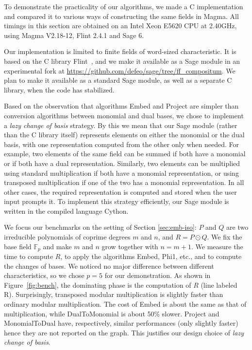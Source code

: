\documentclass{sig-alternate}
\def\F {\ensuremath{\mathbb{F}}}
\newcounter{algo}
\begin{document}
To demonstrate the practicality of our algorithms, we made a C
implementation and compared it to various ways of constructing the
same fields in Magma. All timings in this section are obtained on an
Intel Xeon E5620 CPU at 2.40GHz, using Magma V2.18-12, Flint 2.4.1 and
Sage 6.

Our implementation is limited to finite fields of word-sized
characteristic.  It is based on the C library
Flint~\cite{hart2010flint}, and we make it available as a Sage module
in an experimental fork at
\url{https://github.com/defeo/sage/tree/ff_compositum}. We plan to
make it available as a standard Sage module, as well as a separate C
library, when the code has stabilized.

Based on the observation that algorithms {\sf Embed} and {\sf Project}
are simpler than conversion algorithms between monomial and dual
bases, we chose to implement a \emph{lazy change of basis}
strategy. By this we mean that our Sage module (rather than the C
library itself) represents elements on either the monomial or the dual
basis, with one representation computed from the other only when
needed. For example, two elements of the same field can be summed if
both have a monomial or if both have a dual representation. Similarly,
two elements can be multiplied using standard multiplication if both
have a monomial representation, or using transposed multiplication if
one of the two has a monomial representation. In all other cases, the
required representation is computed and stored when the user input
prompts it. To implement this strategy efficiently, our Sage module is
written in the compiled language Cython.

We focus our benchmarks on the setting of Section \ref{sec:emb-iso}:
$P$ and $Q$ are two irreducible polynomials of coprime degrees $m$ and
$n$, and $R=P\odot Q$. We fix the base field $\F_p$ and make $m$ and
$n$ grow together with $n=m+1$. We measure the time to compute $R$, to
apply the algorithms {\sf Embed}, {\sf Phi1}, etc., and to compute the
changes of bases. We noticed no major difference between different
characteristics, so we chose $p=5$ for our demonstration. As shown in
Figure~\ref{fig:bench}, the dominating phase is the computation of $R$
(line labeled {\sf R}). Surprisingly, transposed modular
multiplication is slightly faster than ordinary modular
multiplication. The cost of {\sf Embed} is about the same as that of
multiplication, while {\sf DualToMonomial} is about 50\% slower. {\sf
  Project} and {\sf MonomialToDual} have, respectively, similar
performances (only slightly faster) hence they are not reported on the
graph. This justifies our design choice of \emph{lazy change of
  basis}.  
\end{document}
